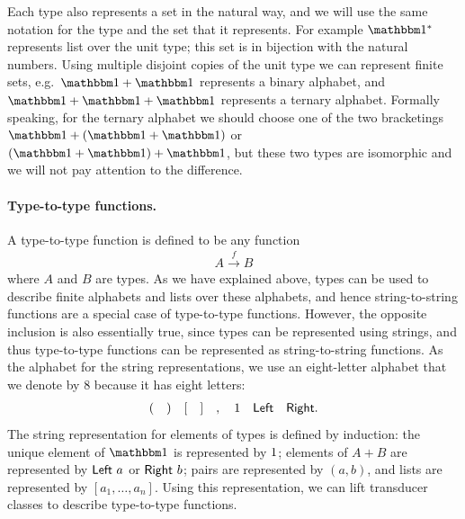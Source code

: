 Each type also represents a set in the natural way, and we will use the same notation for the type and the set that it represents. For example $\onetype^*$ represents list over the unit type; this set is in bijection with the natural numbers. Using multiple disjoint copies of the unit type we can represent finite sets, e.g.~$\onetype + \onetype$ represents a binary alphabet, and $\onetype + \onetype + \onetype$ represents a ternary alphabet. Formally speaking, for the ternary alphabet we should choose one of the two bracketings $\onetype + (\onetype + \onetype)$ or $(\onetype + \onetype) + \onetype$, but these two types are isomorphic and we will not  pay attention to the difference.

\paragraph*{Type-to-type functions.}
A type-to-type function is defined to be  any function 
\begin{align*}
A \xrightarrow f B
\end{align*}
where $A$ and $B$ are types. As we have explained above, types can be used to describe finite alphabets and lists over these alphabets, and hence string-to-string functions are a special case of type-to-type functions.  However, the opposite inclusion is also essentially true, since types can be represented using strings, and thus type-to-type functions can be represented as string-to-string functions.
As the alphabet for the string representations,  we use  an eight-letter alphabet that we denote by $8$ because it has eight letters: 
\begin{align*}
( \quad ) \quad [ \quad ] \quad , \quad 1 \quad \mathsf{Left} \quad \mathsf{Right}.
\end{align*}
 The string representation for elements of types is defined by induction:  the unique element of $\onetype$ is represented by  $1$; elements of $A + B$ are represented by $\mathsf{Left}\  a$ or $\mathsf{Right}\  b$; pairs are represented by $(a,b)$, and lists are represented by $[a_1,\ldots,a_n]$. Using this representation, we can  lift transducer classes to describe type-to-type functions.







